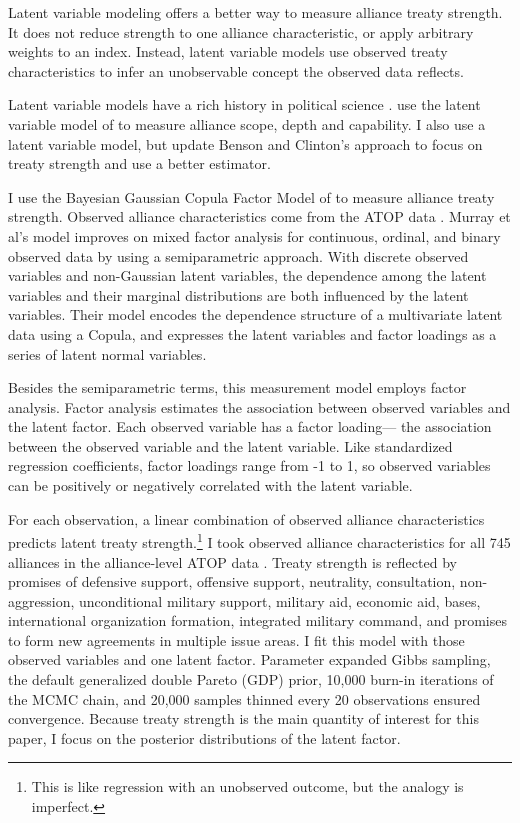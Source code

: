 \documentclass[12pt]{article}
\begin{document}
Latent variable modeling offers a better way to measure alliance treaty strength. 
It does not reduce strength to one alliance characteristic, or apply arbitrary weights to an index. 
Instead, latent variable models use observed treaty characteristics to infer an unobservable concept the observed data reflects. 


Latent variable models have a rich history in political science \citep{Clintonetal2004, TreierJackman2008, Fariss2014}. 
\citet{BensonClinton2016} use the latent variable model of \citet{Quinn2004} to measure alliance scope, depth and capability.
I also use a latent variable model, but update Benson and Clinton's approach to focus on treaty strength and use a better estimator. 


I use the Bayesian Gaussian Copula Factor Model of \citet{Murrayetal2013} to measure alliance treaty strength. 
Observed alliance characteristics come from the ATOP data \citep{Leedsetal2002}.
Murray et al's model improves on mixed factor analysis for continuous, ordinal, and binary observed data by using a semiparametric approach. 
With discrete observed variables and non-Gaussian latent variables, the dependence among the latent variables and their marginal distributions are both influenced by the latent variables.
Their model encodes the dependence structure of a multivariate latent data using a Copula, and expresses the latent variables and factor loadings as a series of latent normal variables. 


Besides the semiparametric terms, this measurement model employs factor analysis.
Factor analysis estimates the association between observed variables and the latent factor.
Each observed variable has a factor loading--- the association between the observed variable and the latent variable.  
Like standardized regression coefficients, factor loadings range from -1 to 1, so observed variables can be positively or negatively correlated with the latent variable.  


For each observation, a linear combination of observed alliance characteristics predicts latent treaty strength.\footnote{This is like regression with an unobserved outcome, but the analogy is imperfect.} 
I took observed alliance characteristics for all 745 alliances in the alliance-level ATOP data \citep{Leedsetal2002}. 
Treaty strength is reflected by promises of defensive support, offensive support, neutrality, consultation, non-aggression, unconditional military support, military aid, economic aid, bases, international organization formation, integrated military command, and promises to form new agreements in multiple issue areas. 
I fit this model with those observed variables and one latent factor.
Parameter expanded Gibbs sampling, the default generalized double Pareto (GDP) prior, 10,000 burn-in iterations of the MCMC chain, and 20,000 samples thinned every 20 observations ensured convergence. 
Because treaty strength is the main quantity of interest for this paper, I focus on the posterior distributions of the latent factor. 
\end{document}
